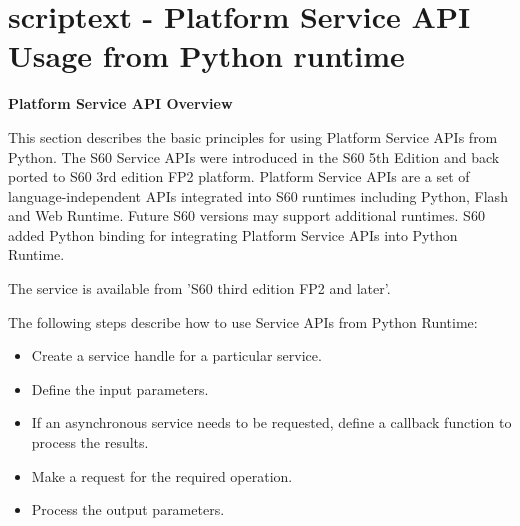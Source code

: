%
%
%

\chapter{scriptext - Platform Service API Usage from Python runtime}
\label{scriptext}

\label{sec:s60scriptext}

{\bf Platform Service API Overview} \break

This section describes the basic principles for using Platform Service APIs from Python. The S60 Service APIs were introduced in the S60 5th Edition and back ported to S60 3rd edition FP2 platform. Platform Service APIs are a set of language-independent APIs integrated into S60 runtimes including Python, Flash and Web Runtime. Future S60 versions may support additional runtimes. S60 added Python binding for integrating Platform Service APIs into Python Runtime.

\begin{notice}[note]
The service is available from 'S60 third edition FP2 and later'.
\end{notice}

The following steps describe how to use Service APIs from Python Runtime:
\begin {itemize}
\item Create a service handle for a particular service.
\item Define the input parameters.
\item If an asynchronous service needs to be requested, define a callback function to process the results.
\item Make a request for the required operation.
\item Process the output parameters.
\end {itemize}

